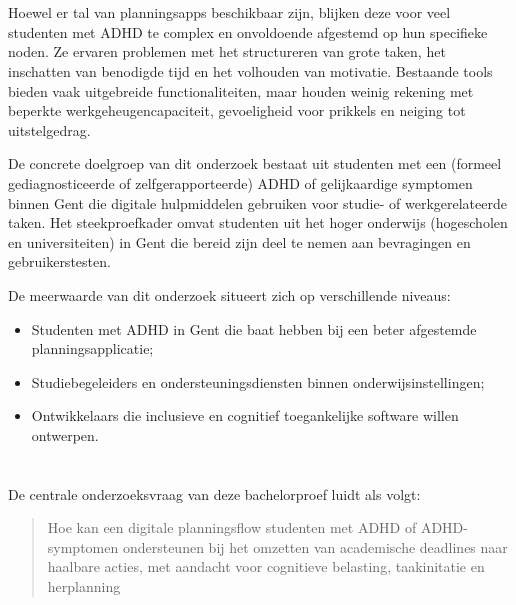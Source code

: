 \section{}%
\label{sec:probleemstelling}

Hoewel er tal van planningsapps beschikbaar zijn, blijken deze voor veel studenten met ADHD te complex en onvoldoende afgestemd op hun specifieke noden. Ze ervaren problemen met het structureren van grote taken, het inschatten van benodigde tijd en het volhouden van motivatie. Bestaande tools bieden vaak uitgebreide functionaliteiten, maar houden weinig rekening met beperkte werkgeheugencapaciteit, gevoeligheid voor prikkels en neiging tot uitstelgedrag.

De concrete doelgroep van dit onderzoek bestaat uit studenten met een (formeel gediagnosticeerde of zelfgerapporteerde) ADHD of gelijkaardige symptomen binnen Gent die digitale hulpmiddelen gebruiken voor studie- of werkgerelateerde taken. Het steekproefkader omvat studenten uit het hoger onderwijs (hogescholen en universiteiten) in Gent die bereid zijn deel te nemen aan bevragingen en gebruikerstesten.

De meerwaarde van dit onderzoek situeert zich op verschillende niveaus:
\begin{itemize}
  \item Studenten met ADHD in Gent die baat hebben bij een beter afgestemde planningsapplicatie;
  \item Studiebegeleiders en ondersteuningsdiensten binnen onderwijsinstellingen;
  \item Ontwikkelaars die inclusieve en cognitief toegankelijke software willen ontwerpen.
\end{itemize}

\section{}%
\label{sec:onderzoeksvraag}

De centrale onderzoeksvraag van deze bachelorproef luidt als volgt:

\begin{quote}
Hoe kan een digitale planningsflow studenten met ADHD of ADHD-symptomen ondersteunen bij het omzetten van academische deadlines naar haalbare acties, met aandacht voor cognitieve belasting, taakinitatie en herplanning 
\end{quote}

